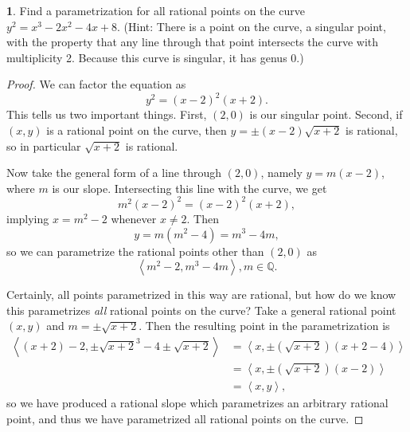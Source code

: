 \documentclass[12pt]{article}
\theoremstyle{definition}
\newtheorem{ex}{}
\begin{document}
\begin{ex}
	Find a parametrization for all rational points on the curve $y^2 = x^3 - 2x^2 - 4x + 8$.
	(Hint: There is a point on the curve, a singular point, with the property that any line through that point intersects the curve with multiplicity 2.
	Because this curve is singular, it has genus 0.)
\end{ex}
\begin{proof}
	We can factor the equation as \begin{equation*}
		y^2 = (x-2)^2(x+2).
	\end{equation*}
	This tells us two important things.
	First, $(2, 0)$ is our singular point.
	Second, if $(x, y)$ is a rational point on the curve, then $y=\pm(x-2)\sqrt{x+2}$ is rational, so in particular $\sqrt{x+2}$ is rational.

	Now take the general form of a line through $(2, 0)$, namely $y = m(x-2)$, where $m$ is our slope.
	Intersecting this line with the curve, we get \begin{equation*}
		m^2(x-2)^2 = (x-2)^2(x+2),
	\end{equation*}
	implying $x = m^2 - 2$ whenever $x \neq 2$.
	Then \begin{equation*}
		y = m(m^2 - 4) = m^3 - 4m,
	\end{equation*}
	so we can parametrize the rational points other than $(2, 0)$ as \begin{equation*}
		\left\langle m^2 - 2, m^3 - 4m \right\rangle, m \in \mathbb{Q}.
	\end{equation*}

	Certainly, all points parametrized in this way are rational, but how do we know this parametrizes \textit{all} rational points on the curve?
	Take a general rational point $(x, y)$ and $m = \pm\sqrt{x + 2}$.
	Then the resulting point in the parametrization is \begin{align*}
		\left\langle (x+2)-2, \pm\sqrt{x+2}^3-4\pm\sqrt{x+2} \right\rangle & = \left\langle x, \pm(\sqrt{x+2})(x+2-4) \right\rangle \\
		                                                                   & = \left\langle x, \pm(\sqrt{x+2})(x-2) \right\rangle   \\
		                                                                   & = \left\langle x, y \right\rangle,
	\end{align*}
	so we have produced a rational slope which parametrizes an arbitrary rational point, and thus we have parametrized all rational points on the curve.
\end{proof}
\end{document}
